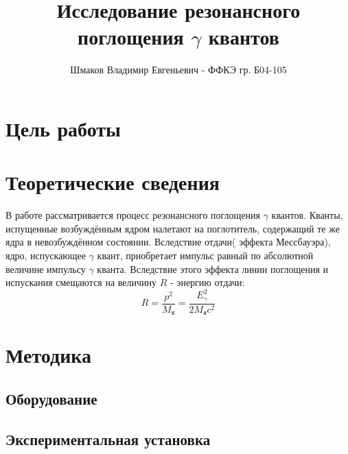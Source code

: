 \documentclass[a4paper, 14pt]{article}
\title{\textcolor{main_title}{Исследование резонансного поглощения $\gamma$ квантов}}
\author{Шмаков Владимир Евгеньевич - ФФКЭ гр. Б04-105}
\begin{document}
\maketitle



\section*{\textcolor{header}{Цель работы}}




\section*{\textcolor{header}{Теоретические сведения}}


\begin{minipage}{0.5\textwidth}

    

\end{minipage}
\hfill
\begin{minipage}{0.5\textwidth}
    \raggedright
    В работе рассматривается процесс резонансного поглощения $\gamma$ квантов.
    Кванты, испущенные возбуждённым ядром налетают на поглотитель, содержащий те же
    ядра в невозбуждённом состоянии.
    \newline
    Вследствие отдачи( \textcolor{defenition}{эффекта Мессбауэра}), ядро, испускающее $\gamma$ квант, приобретает
    импульс равный по абсолютной величине импульсу $\gamma$ кванта. Вследствие этого эффекта
    линии поглощения и испускания смещаются на величину $R$ - энергию отдачи:
    \begin{equation}
        R = \frac{p^{2}}{M_{\text{я}}} = \frac{E_{\gamma}^{2}}{2 M_{\text{я}} c^{2}}
    \end{equation}
\end{minipage}




\section*{\textcolor{header}{Методика}}
\subsection*{\textcolor{sub_header}{Оборудование}}


\subsection*{\textcolor{sub_header}{Экспериментальная установка}}
\end{document}
